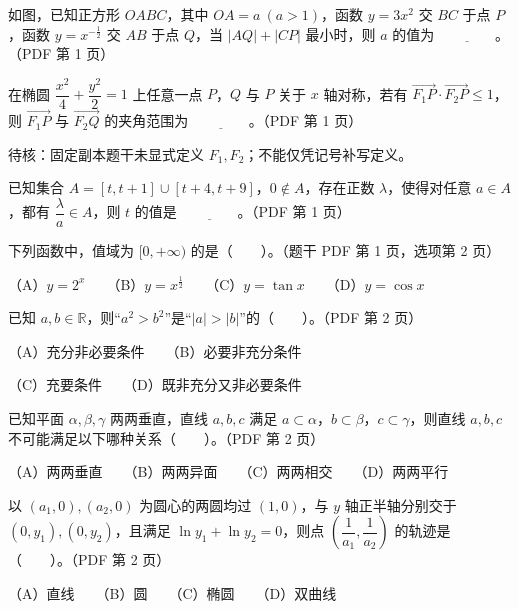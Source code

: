 \begin{question}
如图，已知正方形 $OABC$，其中 $OA=a\ (a>1)$，函数 $y=3x^2$ 交 $BC$ 于点 $P$，函数 $y=x^{-\frac12}$ 交 $AB$ 于点 $Q$，当 $|AQ|+|CP|$ 最小时，则 $a$ 的值为 $\underline{\qquad\qquad}$。（PDF 第 1 页）
\nopagebreak[4]
\begin{center}\end{center}
\nopagebreak[4]
\end{question}
\begin{question}
在椭圆 $\dfrac{x^2}{4}+\dfrac{y^2}{2}=1$ 上任意一点 $P$，$Q$ 与 $P$ 关于 $x$ 轴对称，若有 $\overrightarrow{F_1P}\cdot\overrightarrow{F_2P}\leq1$，则 $\overrightarrow{F_1P}$ 与 $\overrightarrow{F_2Q}$ 的夹角范围为 $\underline{\qquad\qquad}$。（PDF 第 1 页）

\begin{gktip}
待核：固定副本题干未显式定义 $F_1,F_2$；不能仅凭记号补写定义。
\end{gktip}

\end{question}
\begin{question}
已知集合 $A=[t,t+1]\cup[t+4,t+9]$，$0\notin A$，存在正数 $\lambda$，使得对任意 $a\in A$，都有 $\dfrac{\lambda}{a}\in A$，则 $t$ 的值是 $\underline{\qquad\qquad}$。（PDF 第 1 页）

\end{question}

\begin{question}
下列函数中，值域为 $[0,+\infty)$ 的是\mbox{（　　）}。（题干 PDF 第 1 页，选项第 2 页）

（A）$y=2^x$　　（B）$y=x^{\frac12}$　　（C）$y=\tan x$　　（D）$y=\cos x$

\end{question}
\begin{question}
已知 $a,b\in\mathbb R$，则“$a^2>b^2$”是“$|a|>|b|$”的\mbox{（　　）}。（PDF 第 2 页）

（A）充分非必要条件　　（B）必要非充分条件

（C）充要条件　　（D）既非充分又非必要条件

\end{question}
\begin{question}
已知平面 $\alpha,\beta,\gamma$ 两两垂直，直线 $a,b,c$ 满足 $a\subset\alpha$，$b\subset\beta$，$c\subset\gamma$，则直线 $a,b,c$ 不可能满足以下哪种关系\mbox{（　　）}。（PDF 第 2 页）

（A）两两垂直　　（B）两两异面　　（C）两两相交　　（D）两两平行

\end{question}
\begin{question}
以 $(a_1,0),(a_2,0)$ 为圆心的两圆均过 $(1,0)$，与 $y$ 轴正半轴分别交于 $(0,y_1),(0,y_2)$，且满足 $\ln y_1+\ln y_2=0$，则点 $\left(\dfrac1{a_1},\dfrac1{a_2}\right)$ 的轨迹是\mbox{（　　）}。（PDF 第 2 页）

（A）直线　　（B）圆　　（C）椭圆　　（D）双曲线

\end{question}

